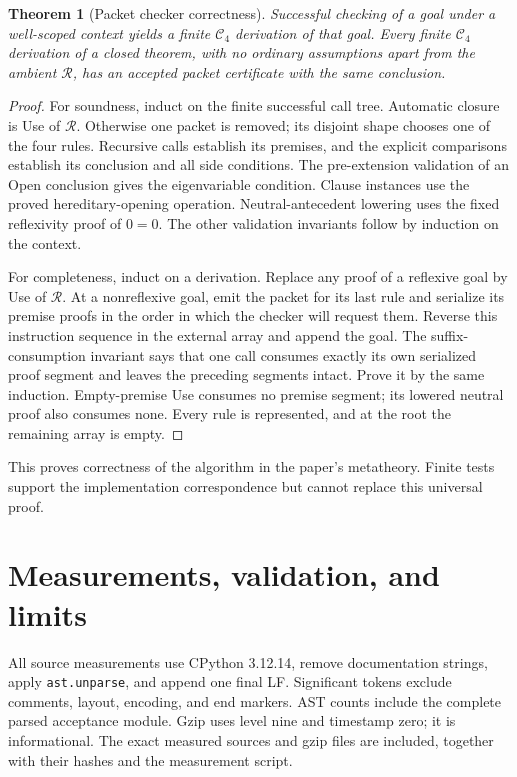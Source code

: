 \documentclass[11pt]{article}
\newtheorem{theorem}{Theorem}[section]
\theoremstyle{definition}
\newcommand{\RC}{\mathcal C_4}
\newcommand{\RR}{\mathcal R}
\begin{document}
\begin{theorem}[Packet checker correctness]
\label{thm:packet}
Successful checking of a goal under a well-scoped context yields a finite
$\RC$ derivation of that goal. Every finite $\RC$ derivation of a closed
theorem, with no ordinary assumptions apart from the ambient $\RR$, has an
accepted packet certificate with the same conclusion.
\end{theorem}
\begin{proof}
For soundness, induct on the finite successful call tree. Automatic closure
is Use of $\RR$. Otherwise one packet is removed; its disjoint shape chooses
one of the four rules. Recursive calls establish its premises, and the
explicit comparisons establish its conclusion and all side conditions.
The pre-extension validation of an Open conclusion gives the eigenvariable
condition. Clause instances use the proved hereditary-opening operation.
Neutral-antecedent lowering uses the fixed reflexivity proof of $0=0$.
The other validation invariants follow by induction on the context.

For completeness, induct on a derivation. Replace any proof of a reflexive
goal by Use of $\RR$. At a nonreflexive goal, emit the packet for its last
rule and serialize its premise proofs in the order in which the checker
will request them. Reverse this instruction sequence in the external array
and append the goal. The suffix-consumption invariant says that one call
consumes exactly its own serialized proof segment and leaves the preceding
segments intact. Prove it by the same induction. Empty-premise Use consumes
no premise segment; its lowered neutral proof also consumes none. Every
rule is represented, and at the root the remaining array is empty.
\end{proof}

This proves correctness of the algorithm in the paper's metatheory.
Finite tests support the implementation correspondence but cannot replace
this universal proof.

\section{Measurements, validation, and limits}
\label{sec:measurements}

All source measurements use CPython 3.12.14, remove documentation strings,
apply \texttt{ast.unparse}, and append one final LF. Significant tokens
exclude comments, layout, encoding, and end markers. AST counts include
the complete parsed acceptance module. Gzip uses level nine and timestamp
zero; it is informational. The exact measured sources and gzip files are
included, together with their hashes and the measurement script.
\end{document}
